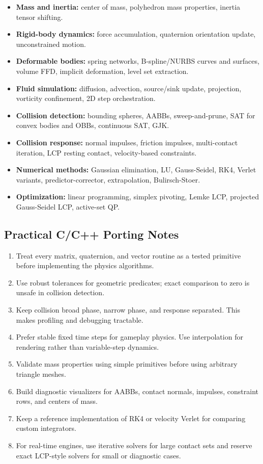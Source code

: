 \documentclass[10pt,letterpaper]{article}
\begin{document}
\begin{itemize}
\item \textbf{Mass and inertia:} center of mass, polyhedron mass properties, inertia tensor shifting.
\item \textbf{Rigid-body dynamics:} force accumulation, quaternion orientation update, unconstrained motion.
\item \textbf{Deformable bodies:} spring networks, B-spline/NURBS curves and surfaces, volume FFD, implicit deformation, level set extraction.
\item \textbf{Fluid simulation:} diffusion, advection, source/sink update, projection, vorticity confinement, 2D step orchestration.
\item \textbf{Collision detection:} bounding spheres, AABBs, sweep-and-prune, SAT for convex bodies and OBBs, continuous SAT, GJK.
\item \textbf{Collision response:} normal impulses, friction impulses, multi-contact iteration, LCP resting contact, velocity-based constraints.
\item \textbf{Numerical methods:} Gaussian elimination, LU, Gauss-Seidel, RK4, Verlet variants, predictor-corrector, extrapolation, Bulirsch-Stoer.
\item \textbf{Optimization:} linear programming, simplex pivoting, Lemke LCP, projected Gauss-Seidel LCP, active-set QP.
\end{itemize}

\subsection*{Practical C/C++ Porting Notes}

\begin{enumerate}
\item Treat every matrix, quaternion, and vector routine as a tested primitive before implementing the physics algorithms.
\item Use robust tolerances for geometric predicates; exact comparison to zero is unsafe in collision detection.
\item Keep collision broad phase, narrow phase, and response separated. This makes profiling and debugging tractable.
\item Prefer stable fixed time steps for gameplay physics. Use interpolation for rendering rather than variable-step dynamics.
\item Validate mass properties using simple primitives before using arbitrary triangle meshes.
\item Build diagnostic visualizers for AABBs, contact normals, impulses, constraint rows, and centers of mass.
\item Keep a reference implementation of RK4 or velocity Verlet for comparing custom integrators.
\item For real-time engines, use iterative solvers for large contact sets and reserve exact LCP-style solvers for small or diagnostic cases.
\end{enumerate}
\end{document}
